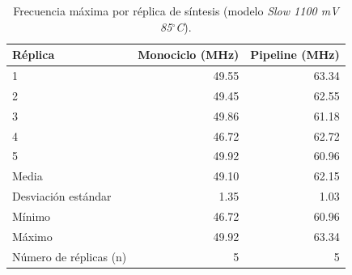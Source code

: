 \begin{table}[htbp]
\centering
\caption{Frecuencia máxima por réplica de síntesis (modelo \emph{Slow 1100 mV 85$^\circ$C}).}
\label{tab:fmax_replicas}
\begin{tabular}{lrr}
\toprule
Réplica & Monociclo (MHz) & Pipeline (MHz) \\
\midrule
1 & 49.55 & 63.34 \\
2 & 49.45 & 62.55 \\
3 & 49.86 & 61.18 \\
4 & 46.72 & 62.72 \\
5 & 49.92 & 60.96 \\
\midrule
Media & 49.10 & 62.15 \\
Desviación estándar & 1.35 & 1.03 \\
Mínimo & 46.72 & 60.96 \\
Máximo & 49.92 & 63.34 \\
Número de réplicas (n) & 5 & 5 \\
\bottomrule
\end{tabular}
\end{table}
